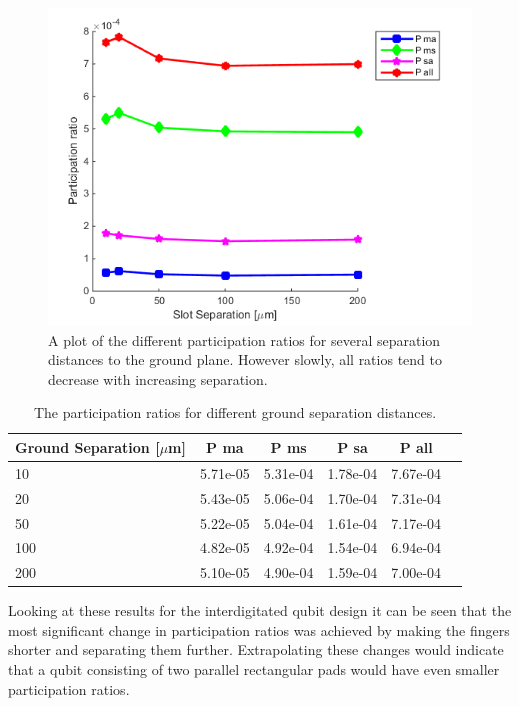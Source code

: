  \begin{figure}
 	\centering
 	\includegraphics[scale = 0.7]{Figures/Ratio_plots/SlotSize_legend}
 	\caption{A plot of the different participation ratios for several separation distances to the ground plane. However slowly, all ratios tend to decrease with increasing separation.}
 	\label{fig:SlotSize_legend}
 \end{figure}

\begin{table}
	\begin{center}
		\begin{tabular}{ | l || c | c | c | c | c |}
			\hline
			Ground Separation [\(\mu\)m] & P ma & P ms & P sa & P all \\ \hline
			10 & 5.71e-05 & 5.31e-04 & 1.78e-04 & 7.67e-04 \\
			20 & 5.43e-05 & 5.06e-04 & 1.70e-04 & 7.31e-04 \\
			50 & 5.22e-05 & 5.04e-04 & 1.61e-04 & 7.17e-04 \\
			100 & 4.82e-05 & 4.92e-04 & 1.54e-04 & 6.94e-04 \\
			200 & 5.10e-05 & 4.90e-04 & 1.59e-04 & 7.00e-04\\
			\hline
		\end{tabular}
	\end{center}
	\caption{The participation ratios for different ground separation distances.}
	\label{table:ratio_groundseparation}
\end{table}

Looking at these results for the interdigitated qubit design it can be seen that the most significant change in participation ratios was achieved by making the fingers shorter and separating them further. Extrapolating these changes would indicate that a qubit consisting of two parallel rectangular pads would have even smaller participation ratios.

